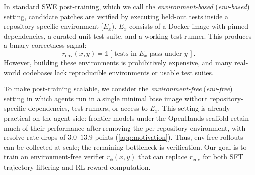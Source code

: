\documentclass[]{arxiv_template}
\newcommand{\approach}{Dockerless\xspace}
\begin{document}
In standard SWE post-training, which we call the \emph{environment-based} (\emph{env-based}) setting, candidate patches are verified by executing held-out tests inside a repository-specific environment ($E_x$). $E_x$ consists of a Docker image with pinned dependencies, a curated unit-test suite, and a working test runner.
This produces a binary correctness signal:
\begin{equation}
  r_{\text{env}}(x, y) = \mathbb{1}\!\left[\,\text{tests in } E_x \text{ pass under } y\,\right].
  \label{eq:env-reward}
\end{equation}
However, building these environments is prohibitively expensive, and many real-world codebases lack reproducible environments or usable test suites.


To make post-training scalable, we consider the \emph{environment-free} (\emph{env-free}) setting in which agents run in a single minimal base image without repository-specific dependencies, test runners, or access to \(E_x\).
This setting is already practical on the agent side: frontier models under the OpenHands scaffold retain much of their performance after removing the per-repository environment, with resolve-rate drops of $3.0$--$13.9$ points (\cref{app:motivation}).
Thus, env-free rollouts can be collected at scale; the remaining bottleneck is verification.
Our goal is to train an environment-free verifier \(r_\phi(x,y)\) that can replace \(r_{\text{env}}\) for both SFT trajectory filtering and RL reward computation.
\end{document}
